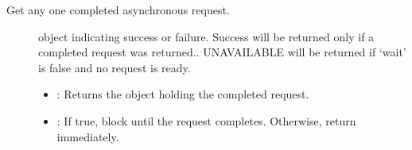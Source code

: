 \documentclass[letterpaper,10pt,english]{sphinxmanual}
\begin{document}
\begin{fulllineitems}
\begin{fulllineitems}
\label{\detokenize{cpp_api/classnvidia_1_1inferenceserver_1_1client_1_1InferContext:_CPPv4N6nvidia15inferenceserver6client12InferContext20GetReadyAsyncRequestEPNSt10shared_ptrI7RequestEEb}}%
\pysigstartmultiline
{}\label{\detokenize{cpp_api/classnvidia_1_1inferenceserver_1_1client_1_1InferContext:classnvidia_1_1inferenceserver_1_1client_1_1InferContext_1a27512d1f8f7099d20b2e0eaaac90c3f0}}%
\pysigstopmultiline
Get any one completed asynchronous request. 

\begin{description}
\item[{}] \leavevmode
{\hyperref[\detokenize{cpp_api/classnvidia_1_1inferenceserver_1_1client_1_1Error:classnvidia_1_1inferenceserver_1_1client_1_1Error}]{}} object indicating success or failure. Success will be returned only if a completed request was returned.. UNAVAILABLE will be returned if ‘wait’ is false and no request is ready. 

\item[{}] \leavevmode\begin{itemize}
\item {} 
: Returns the {\hyperref[\detokenize{cpp_api/classnvidia_1_1inferenceserver_1_1client_1_1InferContext_1_1Request:classnvidia_1_1inferenceserver_1_1client_1_1InferContext_1_1Request}]{}} object holding the completed request. 

\item {} 
: If true, block until the request completes. Otherwise, return immediately. 

\end{itemize}

\end{description}



\end{fulllineitems}
\end{fulllineitems}
\end{document}
